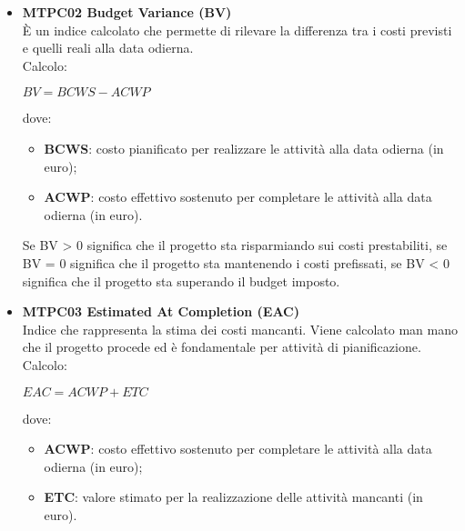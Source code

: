 \begin{itemize}

\item \textbf{MTPC02 Budget Variance (BV)}\-\\
È un indice calcolato che permette di rilevare la differenza tra i costi previsti e quelli reali alla data odierna. \\
Calcolo:
\begin{center}
	$BV = BCWS - ACWP$
\end{center} 
dove:
\begin{itemize}
	\item \textbf{BCWS}: costo pianificato per realizzare le attività alla data odierna (in euro);
	\item \textbf{ACWP}: costo effettivo sostenuto per completare le attività alla data odierna (in euro).
\end{itemize}
Se BV > 0 significa che il progetto sta risparmiando sui costi prestabiliti, se BV = 0 significa che il progetto sta mantenendo i costi prefissati, se BV < 0 significa che il progetto sta superando il budget imposto.

\item \textbf{MTPC03 Estimated At Completion (EAC)}\-\\
Indice che rappresenta la stima dei costi mancanti. Viene calcolato man mano che il progetto procede ed è fondamentale per attività di pianificazione. \\
Calcolo:
\begin{center}
	$EAC = ACWP + ETC$
\end{center}
dove:
\begin{itemize}
	\item \textbf{ACWP}: costo effettivo sostenuto per completare le attività alla data odierna (in euro);
	\item \textbf{ETC}: valore stimato per la realizzazione delle attività mancanti (in euro).
\end{itemize}

\end{itemize}

\iffalse
\paragraph{MTPC04 Cost Variance(CV)}\-\\
Indice che quantifica la produttività o efficienza monitorando se il valore del costo realmente maturato è minore, maggiore o uguale al costo effettivo.
Calcolo:
\begin{center}
	$CV = BCWP - ACWP$
\end{center}
dove:
\begin{itemize}
	\item BCWP: valore delle attività realizzate alla data odierna(in euro o giorni);
	\item ACWP: costo effettivo sostenuto per completare le attività alla data odierna(in euro o giorni).
\end{itemize}
Se CV > 0 significa che il progetto produce con maggior efficienza e minor costo.
\fi


